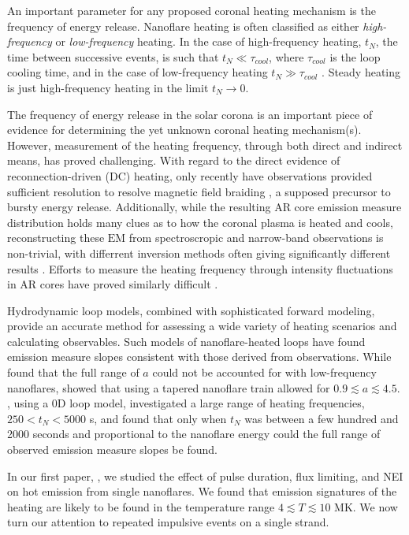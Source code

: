 \documentclass[apj]{emulateapj}
\begin{document}
	\par An important parameter for any proposed coronal heating mechanism is the frequency of energy release. Nanoflare heating is often classified as either \textit{high-frequency} or \textit{low-frequency} heating. In the case of high-frequency heating, $t_N$, the time between successive events, is such that $t_N\ll\tau_{cool}$, where $\tau_{cool}$ is the loop cooling time, and in the case of low-frequency heating $t_N\gg\tau_{cool}$ \citep{cargill_modelling_2015}. Steady heating is just high-frequency heating in the limit $t_N\to0$.
	\par The frequency of energy release in the solar corona is an important piece of evidence for determining the yet unknown coronal heating mechanism(s). However, measurement of the heating frequency, through both direct and indirect means, has proved challenging. With regard to the direct evidence of reconnection-driven (DC) heating, only recently have observations provided sufficient resolution to resolve magnetic field braiding \citep{cirtain_energy_2013}, a supposed precursor to bursty energy release. Additionally, while the resulting AR core emission measure distribution holds many clues as to how the coronal plasma is heated and cools, reconstructing these $\mathrm{EM}$ from spectroscropic and narrow-band observations is non-trivial, with differrent inversion methods often giving significantly different results \citep{landi_monte_2012,aschwanden_benchmark_2015}. Efforts to measure the heating frequency through intensity fluctuations in AR cores have proved similarly difficult \citep{ugarte-urra_determining_2014}.
	\par Hydrodynamic loop models, combined with sophisticated forward modeling, provide an accurate method for assessing a wide variety of heating scenarios and calculating observables. Such models of nanoflare-heated loops have found emission measure slopes consistent with those derived from observations. While \citet{bradshaw_diagnosing_2012} found that the full range of $a$ could not be accounted for with low-frequency nanoflares, \citet{reep_diagnosing_2013} showed that using a tapered nanoflare train allowed for $0.9\lesssim a\lesssim4.5$. \citet{cargill_active_2014}, using a 0D loop model, investigated a large range of heating frequencies, $250<t_N<5000$ s, and found that only when $t_N$ was between a few hundred and 2000 seconds and proportional to the nanoflare energy could the full range of observed emission measure slopes be found. 
	\par In our first paper, \citet{barnes_inference_2016} , we studied the effect of pulse duration, flux limiting, and NEI on hot emission from single nanoflares. We found that emission signatures of the heating are likely to be found in the temperature range $4\lesssim T\lesssim 10$ MK. We now turn our attention to repeated impulsive events on a single strand.
\end{document}
